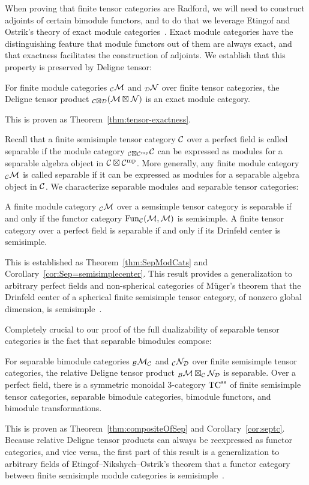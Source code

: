 \documentclass{amsart}
\begin{document}
When proving that finite tensor categories are Radford, we will need to construct adjoints of certain bimodule functors, and to do that we leverage Etingof and Ostrik's theory of exact module categories~\cite{EO-ftc}.  Exact module categories have the distinguishing feature that module functors out of them are always exact, and that exactness facilitates the construction of adjoints.  We establish that this property is preserved by Deligne tensor:
\begin{maintheorem} \label{thm10}
For finite module categories ${}_\mathcal C \mathcal M$ and ${}_\mathcal D \mathcal N$ over finite tensor categories, the Deligne tensor product ${}_{\mathcal C \boxtimes \mathcal D} (\mathcal M \boxtimes \mathcal N)$ is an exact module category.
\end{maintheorem}
\nid This is proven as Theorem~\ref{thm:tensor-exactness}.

Recall that a finite semisimple tensor category $\mathcal C$ over a perfect field is called separable if the module category ${}_{\mathcal C \boxtimes \mathcal C^{\mathrm{mp}}} \mathcal C$ can be expressed as modules for a separable algebra object in $\mathcal C \boxtimes \mathcal C^{\mathrm{mp}}$.  More generally, any finite module category ${}_\mathcal C \mathcal M$ is called separable if it can be expressed as modules for a separable algebra object in $\mathcal C$.  We characterize separable modules and separable tensor categories:
\begin{maintheorem} \label{thm11}
A finite module category ${}_\mathcal C \mathcal M$ over a semsimple tensor category is separable if and only if the functor category $\operatorname{Fun}_\mathcal C(\mathcal M,\mathcal M)$ is semisimple.  A finite tensor category over a perfect field is separable if and only if its Drinfeld center is semisimple.
\end{maintheorem}
\nid This is established as Theorem~\ref{thm:SepModCats} and Corollary~\ref{cor:Sep=semisimplecenter}.  This result provides a generalization to arbitrary perfect fields and non-spherical categories of M\"uger's theorem that the Drinfeld center of a spherical finite semisimple tensor category, of nonzero global dimension, is semisimple~\cite{MR1966525}.

Completely crucial to our proof of the full dualizability of separable tensor categories is the fact that separable bimodules compose:
\begin{maintheorem} \label{thm12}
For separable bimodule categories ${}_\mathcal B \mathcal M_\mathcal C$ and ${}_\mathcal C \mathcal N_\mathcal D$ over finite semisimple tensor categories, the relative Deligne tensor product ${}_\mathcal B \mathcal M \boxtimes_\mathcal C \mathcal N_\mathcal D$ is separable.  Over a perfect field, there is a symmetric monoidal 3-category ${\mathrm{TC}^{\mathrm{ss}}}$ of finite semisimple tensor categories, separable bimodule categories, bimodule functors, and bimodule transformations.
\end{maintheorem}
\nid This is proven as Theorem~\ref{thm:compositeOfSep} and Corollary~\ref{cor:septc}.  Because relative Deligne tensor products can always be reexpressed as functor categories, and vice versa, the first part of this result is a generalization to arbitrary fields of Etingof--Nikshych--Ostrik's theorem that a functor category between finite semisimple module categories is semisimple~\cite{MR2183279}.
\end{document}
